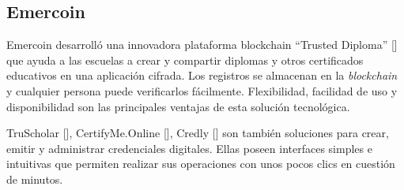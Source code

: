 \subsection{Emercoin}
Emercoin desarrolló una innovadora plataforma blockchain ``Trusted Diploma'' [\cite{87}] que ayuda a las escuelas a crear y compartir diplomas y otros certificados educativos en una aplicación cifrada. Los registros se almacenan en la \textit{blockchain} y cualquier persona puede verificarlos fácilmente. Flexibilidad, facilidad de uso y disponibilidad son las principales ventajas de esta solución tecnológica.


%
%
%
%

TruScholar [\cite{86}], CertifyMe.Online [\cite{85}], Credly [\cite{89}] son también soluciones para crear, emitir y administrar credenciales digitales. Ellas poseen interfaces simples e intuitivas que permiten realizar sus operaciones con unos pocos clics en cuestión de minutos.

%

